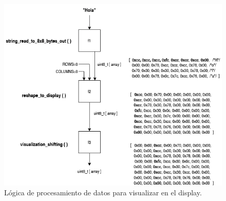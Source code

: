 \begin{figure}[ht]
	\centering
	\includegraphics[width=1\textwidth]{./Figures/displayDataLogic.png}
	\caption{Lógica de procesamiento de datos para visualizar en el display.}
	\label{fig:displayDataLogic}
\end{figure}